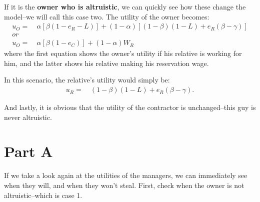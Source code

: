 \documentclass[12pt]{paper}
\begin{document}
If it is the \textbf{owner who is altruistic}, we can quickly see how these change the model--we will call this case two. The utility of the owner becomes:
\begin{align*}
u_O=&~\alpha[\beta(1-e_R-L)]+(1-\alpha)[(1-\beta)(1-L)+e_R(\beta-\gamma)]\\
or\\
u_O=&~\alpha[\beta(1-e_C)]+(1-\alpha)W_R
\end{align*}
where the first equation shows the owner's utility if his relative is working for him, and the latter shows his relative making his reservation wage.

In this scenario, the relative's utility would simply be:
\begin{align*}
u_R=&~(1-\beta)(1-L)+e_R(\beta-\gamma).
\end{align*}

And lastly, it is obvious that the utility of the contractor is unchanged--this guy is never altruistic.


\section{Part A}
If we take a look again at the utilities of the managers, we can
immediately see when they will, and when they won't steal. First,
check when the owner is not altruistic--which is case 1.
\end{document}
